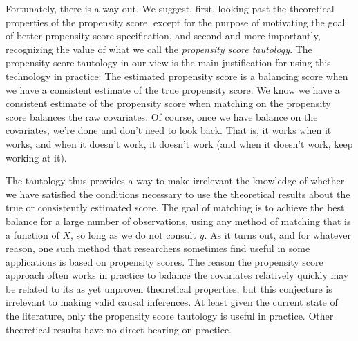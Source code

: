 \documentclass[11pt,titlepage]{article}
\begin{document}
Fortunately, there is a way out.  We suggest, first, looking past the
theoretical properties of the propensity score, except for the purpose
of motivating the goal of better propensity score specification, and
second and more importantly, recognizing the value of what we call the
\emph{propensity score tautology}.  The propensity score tautology in
our view is the main justification for using this technology in
practice: The estimated propensity score is a balancing score when we
have a consistent estimate of the true propensity score.  We know we
have a consistent estimate of the propensity score when matching on
the propensity score balances the raw covariates.  Of course, once we
have balance on the covariates, we're done and don't need to look
back.  That is, it works when it works, and when it doesn't work, it
doesn't work (and when it doesn't work, keep working at it).

The tautology thus provides a way to make irrelevant the knowledge of
whether we have satisfied the conditions necessary to use the
theoretical results about the true or consistently estimated score.
The goal of matching is to achieve the best balance for a large number
of observations, using any method of matching that is a function of
$X$, so long as we do not consult $y$.  As it turns out, and for
whatever reason, one such method that researchers sometimes find
useful in some applications is based on propensity scores.  The reason
the propensity score approach often works in practice to balance the
covariates relatively quickly may be related to its as yet unproven
theoretical properties, but this conjecture is irrelevant to making
valid causal inferences.  At least given the current state of the
literature, only the propensity score tautology is useful in practice.
Other theoretical results have no direct bearing on practice.
\end{document}
